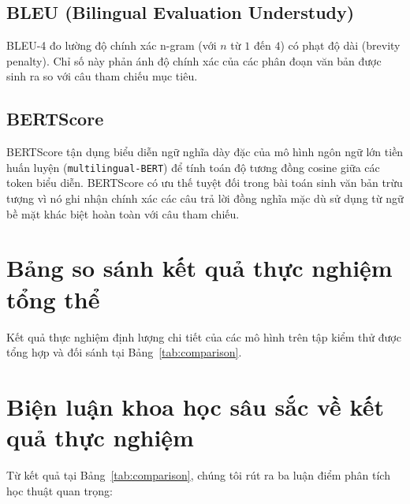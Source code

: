 \subsection{BLEU (Bilingual Evaluation Understudy)}
\cite{papineni2002bleu}
BLEU-4 đo lường độ chính xác n-gram (với $n$ từ $1$ đến $4$) có phạt độ dài (brevity penalty). Chỉ số này phản ánh độ chính xác của các phân đoạn văn bản được sinh ra so với câu tham chiếu mục tiêu.

\subsection{BERTScore}
\cite{zhang2020bertscore}
BERTScore tận dụng biểu diễn ngữ nghĩa dày đặc của mô hình ngôn ngữ lớn tiền huấn luyện (\texttt{multilingual-BERT}) để tính toán độ tương đồng cosine giữa các token biểu diễn. BERTScore có ưu thế tuyệt đối trong bài toán sinh văn bản trừu tượng vì nó ghi nhận chính xác các câu trả lời đồng nghĩa mặc dù sử dụng từ ngữ bề mặt khác biệt hoàn toàn với câu tham chiếu.

\section{Bảng so sánh kết quả thực nghiệm tổng thể}
Kết quả thực nghiệm định lượng chi tiết của các mô hình trên tập kiểm thử được tổng hợp và đối sánh tại Bảng~\ref{tab:comparison}.

\begin{table}[H]
\centering
\caption{Bảng đối sánh hiệu năng định lượng giữa các mô hình trên tập kiểm thử ViMedAQA}
\label{tab:comparison}
\end{table}

\section{Biện luận khoa học sâu sắc về kết quả thực nghiệm}
Từ kết quả tại Bảng~\ref{tab:comparison}, chúng tôi rút ra ba luận điểm phân tích học thuật quan trọng:

